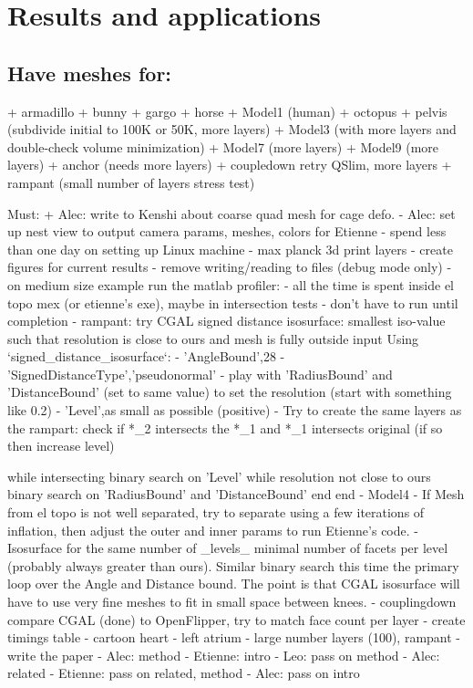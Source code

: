 
\section{Results and applications}
\label{sec:results}

\subsection{Have meshes for:}
  + armadillo
  + bunny
  + gargo
  + horse
  + Model1 (human)
  + octopus
  + pelvis (subdivide initial to 100K or 50K, more layers)
  + Model3 (with more layers and double-check volume minimization)
  + Model7 (more layers)
  + Model9 (more layers)
  + anchor (needs more layers)
  + coupledown retry QSlim, more layers
  + rampant (small number of layers stress test)

Must:
  + Alec: write to Kenshi about coarse quad mesh for cage defo.
  - Alec: set up nest view to output camera params, meshes, colors for Etienne
  - spend less than one day on setting up Linux machine
  - max planck 3d print layers
  - create figures for current results
  - remove writing/reading to files (debug mode only)
  - on medium size example run the matlab profiler:
    - all the time is spent inside el topo mex (or etienne's exe), maybe in
      intersection tests
    - don't have to run until completion
  - rampant: try CGAL signed distance isosurface: smallest iso-value such that
    resolution is close to ours and mesh is fully outside input
    Using `signed\_distance\_isosurface`:
    - 'AngleBound',28 
    - 'SignedDistanceType','pseudonormal'
    - play with 'RadiusBound' and 'DistanceBound' (set to same value) to set the
      resolution (start with something like 0.2)
    - 'Level',as small as possible (positive)
    - Try to create the same layers as the rampart: check if *\_2 intersects the
      *\_1 and *\_1 intersects original (if so then increase level)
  
    while intersecting
      binary search on 'Level'
      while resolution not close to ours
        binary search on 'RadiusBound' and 'DistanceBound'
      end
    end
  - Model4
    - If Mesh from el topo is not well separated, try to separate using a few
      iterations of inflation, then adjust the outer and inner params to run
      Etienne's code.
    - Isosurface for the same number of \_levels\_ minimal number of facets per
      level (probably always greater than ours). Similar binary search this
      time the primary loop over the Angle and Distance bound. The point is
      that CGAL isosurface will have to use very fine meshes to fit in small
      space between knees.
  - couplingdown compare CGAL (done) to OpenFlipper, try to match face count per
    layer
  - create timings table
  - cartoon heart 
  - left atrium
  - large number layers (100), rampant
  - write the paper
  - Alec: method
  - Etienne: intro
  - Leo: pass on method
  - Alec: related
  - Etienne: pass on related, method
  - Alec: pass on intro

